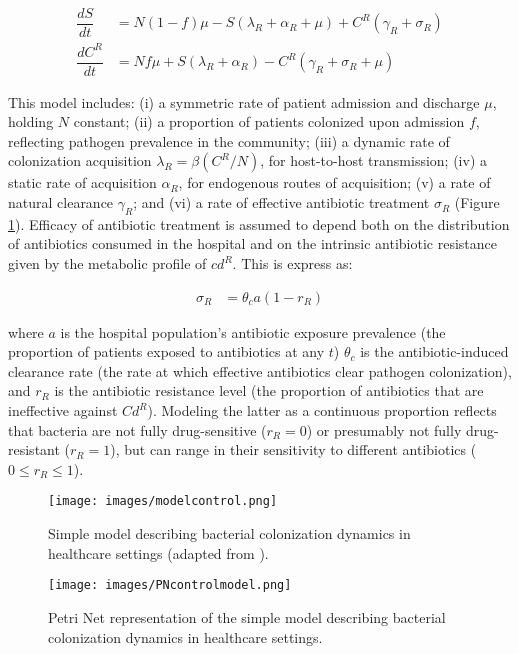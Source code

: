 \documentclass{article}
\begin{document}
\begin{align}\label{eq:odes}
    \dfrac{dS}{dt} &= N(1-f)\mu-S(\lambda_{R}+\alpha_{R}+\mu)+{C}^{R}(\gamma_{R}+\sigma_{R}) \\
    \dfrac{d{C}^{R}}{dt} &= Nf\mu+S(\lambda_{R}+\alpha_{R})-{C}^{R}(\gamma_{R}+\sigma_{R}+\mu)
\end{align}

This model includes: (i) a symmetric rate of patient admission and discharge $\mu$, holding $N$ constant; (ii) a proportion of patients colonized upon admission $f$, reflecting pathogen prevalence in the community; (iii) a dynamic rate of colonization acquisition $\lambda_{R} =\beta({C}^{R}/N)$, for host-to-host transmission; (iv) a static rate of acquisition $\alpha_{R}$, for endogenous routes of acquisition; (v) a rate of natural clearance $\gamma_{R}$; and (vi) a rate of effective antibiotic treatment $\sigma_{R}$ (Figure \ref{fig:modelcontrol}). Efficacy of antibiotic treatment is assumed to depend both on the distribution of antibiotics consumed in the hospital and on the intrinsic antibiotic resistance given by the metabolic profile of ${cd}^{R}$. This is express as:

\begin{align}\label{eq:eff}
    \sigma_{R} &= \theta_{c}a(1-r_{R})
\end{align}

where $a$ is the hospital population’s antibiotic exposure prevalence (the proportion of patients exposed to antibiotics at any $t$) $\theta_{c}$ is the antibiotic-induced clearance rate (the rate at which effective antibiotics clear pathogen colonization), and $r_{R}$ is the antibiotic resistance level (the proportion of antibiotics that are ineffective against ${Cd}^{R}$). Modeling the latter as a continuous proportion reflects that bacteria are not fully drug-sensitive ($r_{R} = 0$) or presumably not fully drug-resistant ($r_{R} = 1$), but can range in their sensitivity to different antibiotics ($0 \leq r_{R} \leq 1$).

\begin{figure}
\centering
\texttt{[image: images/modelcontrol.png]}
\caption{\label{fig:modelcontrol} Simple model describing bacterial colonization dynamics in healthcare settings (adapted from \cite{Smith}). }
\end{figure}

\begin{figure}
\centering
\texttt{[image: images/PNcontrolmodel.png]}
\caption{\label{fig:PNmodelcontrol} Petri Net representation of the simple model describing bacterial colonization dynamics in healthcare settings. }
\end{figure}
\end{document}
